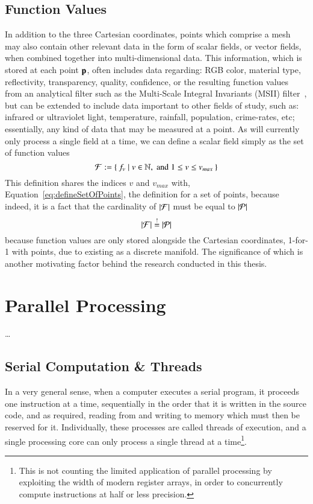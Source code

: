 \subsection{Function Values}
\label{ch2s3ssFV}
In addition to the three Cartesian coordinates, points which comprise a mesh may also contain other relevant data in the form of scalar fields, or vector fields, when combined together into multi-dimensional data. This information, which is stored at each point $\mathbf{p}$, often includes data regarding: RGB color, material type, reflectivity, transparency, quality, confidence, or the resulting function values from an analytical filter such as the Multi-Scale Integral Invariants (MSII) filter~\cite[p.~21]{Mara12}, but can be extended to include data important to other fields of study, such as: infrared or ultraviolet light, temperature, rainfall, population, crime-rates, etc; essentially, any kind of data that may be measured at a point. As  will currently only process a single field at a time, we can define a scalar field simply as the set of function values
%
\begin{equation}
	\mathcal{F} := \left \{\: f_v \mid v \in \mathbb{N}, \;\text{and}\; 1\leq v \leq v_{max} \:\right \}
	\label{eq:defineSetOfFunctionValues}
\end{equation}%
%
%
%
This definition shares the indices $v$ and $v_{max}$ with, Equation~\ref{eq:defineSetOfPoints}, the definition for a set of points, because indeed, it is a fact that the cardinality of $|\mathcal{F}|$ must be equal to $|\mathcal{P}|$
%
\begin{equation}
	|\mathcal{F}| \overset{!}{=} |\mathcal{P}|
\end{equation}
%
because function values are only stored alongside the Cartesian coordinates, 1-for-1 with points, due to \tdd{} existing as a discrete manifold. The significance of which is another motivating factor behind the research conducted in this thesis.

%
%
%
%
%
%
\section{Parallel Processing}
\label{ch2sPP}
\ldots

%
%
%
%
\subsection{Serial Computation \& Threads}
In a very general sense, when a computer executes a serial program, it proceeds one instruction at a time, sequentially in the order that it is written in the source code, and as required, reading from and writing to memory which must then be reserved for it. Individually, these processes are called threads of execution, and a single processing core can only process a single thread at a time\footnote{This is not counting the limited application of parallel processing by exploiting the width of modern register arrays, in order to concurrently compute instructions at half or less precision.}.

